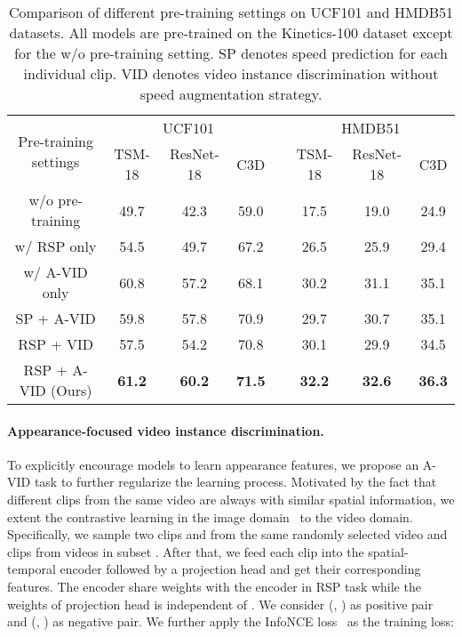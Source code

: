 \documentclass[final]{cvpr}
\begin{document}
\begin{table*}[t]
	\centering
	\caption{Comparison of different pre-training settings on UCF101 and HMDB51 datasets. All models are pre-trained on the Kinetics-100 dataset except for the w/o pre-training setting. SP denotes speed prediction for each individual clip. VID denotes video instance discrimination without speed augmentation strategy.}
	\label{tab:task}
	\begin{tabular}{cccccccc}
		\hline
		\multicolumn{1}{c}{\multirow{2}{*}{Pre-training settings}}         & \multicolumn{3}{c}{UCF101} & &  \multicolumn{3}{c}{HMDB51} \\
		\cline{2-4}
		\cline{6-8}
		& TSM-18  & ResNet-18 & C3D   & & TSM-18  & ResNet-18  & C3D   \\ \hline
		w/o pre-training               & 49.7   & 42.3     & 59.0 & & 17.5   & 19.0      & 24.9 \\
		w/ RSP only       & 54.5   & 49.7     & 67.2 & & 26.5   & 25.9      & 29.4 \\ 
		w/ A-VID only  & 60.8   & 57.2     & 68.1 & & 30.2   & 31.1      & 35.1 \\ 
		SP + A-VID                   & 59.8   & 57.8     & 70.9 & & 29.7   & 30.7      & 35.1 \\ 
		RSP + VID  & 57.5   & 54.2     & 70.8 & & 30.1   & 29.9      & 34.5 \\ \hline
		RSP + A-VID (Ours)      & \textbf{61.2} & \textbf{60.2} & \textbf{71.5} & & \textbf{32.2} & \textbf{32.6} & \textbf{36.3} \\
		\hline
	\end{tabular}
\end{table*}


\paragraph{Appearance-focused video instance discrimination.} 
To explicitly encourage models to learn appearance features, we propose an A-VID task to further regularize the learning process. Motivated by the fact that different clips from the same video are always with similar spatial information, we extent the contrastive learning in the image domain~\cite{wu2018unsupervised} to the video domain. Specifically, we sample two clips  and  from the same  randomly selected video  and  clips  from  videos in subset . After that, we feed each clip into the spatial-temporal encoder  followed by a projection head  and get their corresponding features. The encoder  share weights with the encoder in RSP task while the weights of projection head  is independent of . We consider (, ) as positive pair and (, ) as negative pair. We further apply the InfoNCE loss~\cite{he2019momentum} as the training loss:
\end{document}
